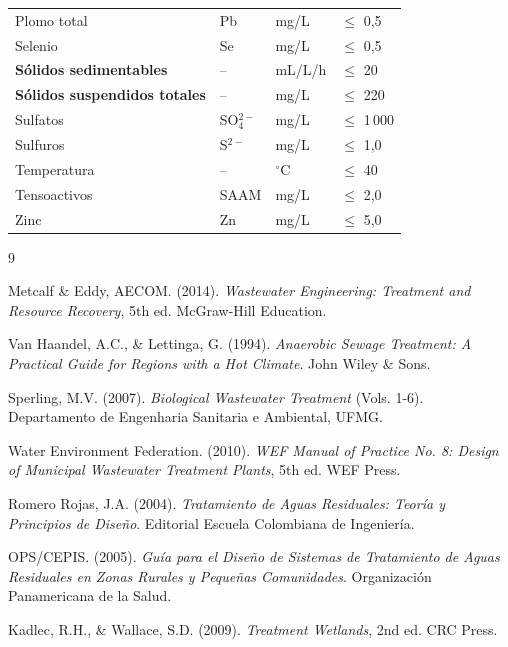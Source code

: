 \documentclass[12pt,a4paper]{article}
\begin{document}
\begin{longtable}{p{4.5cm}p{2.0cm}p{2.0cm}p{3.5cm}}
Plomo total & Pb & mg/L & $\leq$ 0,5 \\
Selenio & Se & mg/L & $\leq$ 0,5 \\
\textbf{S\'olidos sedimentables} & -- & mL/L/h & $\leq$ 20 \\
\textbf{S\'olidos suspendidos totales} & -- & mg/L & $\leq$ 220 \\
Sulfatos & SO$_4^{2-}$ & mg/L & $\leq$ 1\,000 \\
Sulfuros & S$^{2-}$ & mg/L & $\leq$ 1,0 \\
Temperatura & -- & $^\circ$C & $\leq$ 40 \\
Tensoactivos & SAAM & mg/L & $\leq$ 2,0 \\
Zinc & Zn & mg/L & $\leq$ 5,0 \\
\end{longtable}

\newpage
\begin{thebibliography}{9}

Metcalf \& Eddy, AECOM. (2014).
\textit{Wastewater Engineering: Treatment and Resource Recovery}, 5th ed.
McGraw-Hill Education.

Van Haandel, A.C., \& Lettinga, G. (1994).
\textit{Anaerobic Sewage Treatment: A Practical Guide for Regions with a Hot Climate}.
John Wiley \& Sons.

Sperling, M.V. (2007).
\textit{Biological Wastewater Treatment} (Vols. 1-6).
Departamento de Engenharia Sanitaria e Ambiental, UFMG.

Water Environment Federation. (2010).
\textit{WEF Manual of Practice No. 8: Design of Municipal Wastewater Treatment Plants}, 5th ed.
WEF Press.

Romero Rojas, J.A. (2004).
\textit{Tratamiento de Aguas Residuales: Teoría y Principios de Diseño}.
Editorial Escuela Colombiana de Ingeniería.

OPS/CEPIS. (2005).
\textit{Guía para el Diseño de Sistemas de Tratamiento de Aguas Residuales en Zonas Rurales y Pequeñas Comunidades}.
Organización Panamericana de la Salud.

Kadlec, R.H., \& Wallace, S.D. (2009).
\textit{Treatment Wetlands}, 2nd ed.
CRC Press.

\end{thebibliography}
\end{document}
